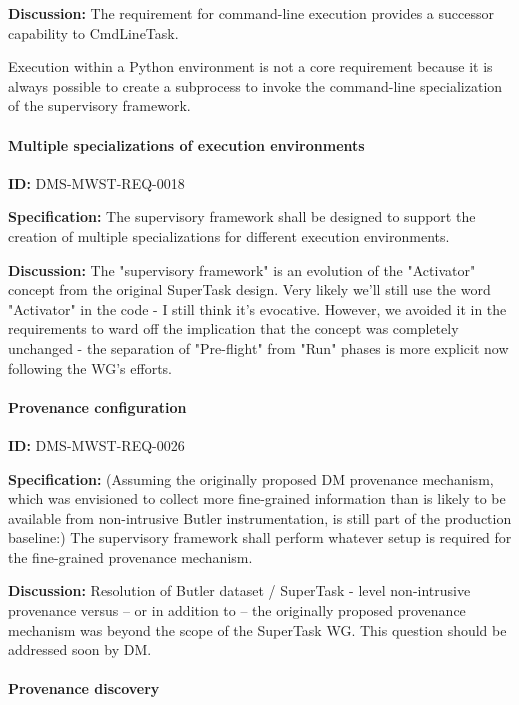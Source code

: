 \documentclass[SE,toc,lsstdraft]{lsstdoc}
\begin{document}
\textbf{Discussion:}
The requirement for command-line execution provides a successor capability to CmdLineTask.

Execution within a Python environment is not a core requirement because it is always possible to create a subprocess to invoke the command-line specialization of the supervisory framework.

\paragraph{Multiple specializations of execution environments}\hfill  %

\label{DMS-MWST-REQ-0018}
\textbf{ID:} DMS-MWST-REQ-0018

\textbf{Specification:}
The supervisory framework shall be designed to support the creation of multiple specializations for different execution environments.

\textbf{Discussion:}
The "supervisory framework" is an evolution of the "Activator" concept from the original SuperTask design. Very likely we'll still use the word "Activator" in the code - I still think it's evocative. However, we avoided it in the requirements to ward off the implication that the concept was completely unchanged - the separation of "Pre-flight" from "Run" phases is more explicit now following the WG's efforts.

\paragraph{Provenance configuration}\hfill  %

\label{DMS-MWST-REQ-0026}
\textbf{ID:} DMS-MWST-REQ-0026

\textbf{Specification:}
(Assuming the originally proposed DM provenance mechanism, which was envisioned to collect more fine-grained information than is likely to be available from non-intrusive Butler instrumentation, is still part of the production baseline:) The supervisory framework shall perform whatever setup is required for the fine-grained provenance mechanism.

\textbf{Discussion:}
Resolution of Butler dataset / SuperTask - level non-intrusive provenance versus – or in addition to – the originally proposed provenance mechanism was beyond the scope of the SuperTask WG. This question should be addressed soon by DM.

\paragraph{Provenance discovery}\hfill  %
\end{document}
